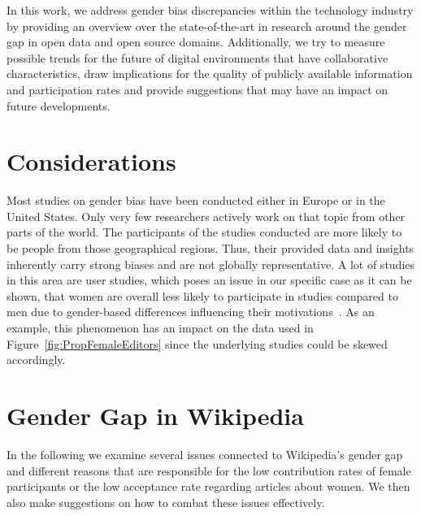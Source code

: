 \documentclass[a4paper, 11pt]{article}
\begin{document}
In this work, we address gender bias discrepancies within the technology industry by providing an overview over the state-of-the-art in research around the gender gap in open data and open source domains. Additionally, we try to measure possible trends for the future of digital environments that have collaborative characteristics, draw implications for the quality of publicly available information and participation rates and provide suggestions that may have an impact on future developments.

\section{Considerations} \label{sec:considerations}
Most studies on gender bias have been conducted either in Europe or in the United States. Only very few researchers actively work on that topic from other parts of the world. The participants of the studies conducted are more likely to be people from those geographical regions. Thus, their provided data and insights inherently carry strong biases and are not globally representative. A lot of studies in this area are user studies, which poses an issue in our specific case as it can be shown, that women are overall less likely to participate in studies compared to men due to gender-based differences influencing their motivations~\cite{lobato2014impact}. As an example, this phenomenon has an impact on the data used in Figure~\ref{fig:PropFemaleEditors} since the underlying studies could be skewed accordingly.

\section{Gender Gap in Wikipedia} \label{sec:gender-gap-wikipedia}
In the following we examine several issues connected to Wikipedia’s gender gap and different reasons that are responsible for the low contribution rates of female participants or the low acceptance rate regarding articles about women. We then also make suggestions on how to combat these issues effectively.
\end{document}
